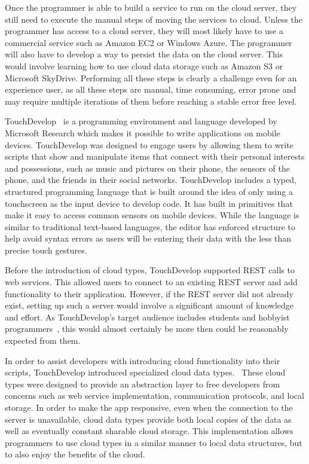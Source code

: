 \documentclass{sigplanconf}
\begin{document}
 Once the programmer is able to build a service to run on the cloud server, they still need to execute the manual steps of moving the services to cloud. Unless the programmer has access to a cloud server, they will most likely have to use a commercial service such as Amazon EC2 or Windows Azure. The programmer will also have to develop a way to persist the data on the cloud server.  This would involve learning how to use cloud data storage such as Amazon S3 or Microsoft SkyDrive.  Performing all these steps is clearly a challenge even for an experience user, as all these steps are manual, time consuming, error prone and may require multiple iterations of them before reaching a stable error free level.
  
TouchDevelop~\cite{Tillmann2011TPC20482372048245} is a programming environment and language developed by Microsoft Research which makes it possible to write applications on mobile devices.  TouchDevelop was designed to engage users by allowing them to write scripts that show and manipulate items that connect with their personal interests and possessions, such as music and pictures on their phone, the sensors of the phone, and the friends in their social networks.  TouchDevelop includes a typed, structured programming language that is built around the idea of only using a touchscreen as the input device to develop code.  It has built in primitives that make it easy to access common sensors on mobile devices.  While the language is similar to traditional text-based languages, the editor has enforced structure to help avoid syntax errors as users will be entering their data with the less than precise touch gestures.
  
Before the introduction of cloud types, TouchDevelop supported REST calls to web services.  This allowed users to connect to an existing REST server and add functionality to their application.  However, if the REST server did not already exist, setting up such a server would involve a significant amount of knowledge and effort.  As TouchDevelop's target audience includes students and hobbyist programmers~\cite{Tillmann2011TPC20482372048245}, this would almost certainly be more then could be reasonably expected from them.  

In order to assist developers with introducing cloud functionality into their scripts, TouchDevelop introduced specialized cloud data types.~\cite{burckhardt2012cloud}  These cloud types were designed to provide an abstraction layer to free developers from concerns such as web service implementation, communication protocols, and local storage.  In order to make the app responsive, even when the connection to the server is unavailable, cloud data types provide both local copies of the data as well as eventually constant sharable cloud storage.   This implementation allows programmers to use cloud types in a similar manner to local data structures, but to also enjoy the benefits of the cloud.
\end{document}
